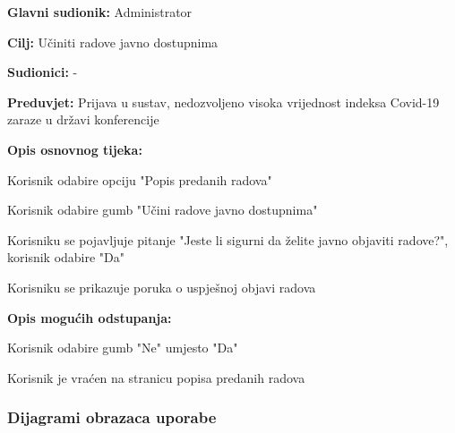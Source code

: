 					\begin{packed_item}
						
						\item \textbf{Glavni sudionik: } Administrator
						\item  \textbf{Cilj:} Učiniti radove javno dostupnima
						\item  \textbf{Sudionici:} -
						\item  \textbf{Preduvjet:} Prijava u sustav, nedozvoljeno visoka vrijednost indeksa Covid-19 zaraze u državi konferencije
						\item  \textbf{Opis osnovnog tijeka:}
						
						\item[] \begin{packed_enum}
							
							\item Korisnik odabire opciju "Popis predanih radova"
							\item Korisnik odabire gumb "Učini radove javno dostupnima"
							\item Korisniku se pojavljuje pitanje "Jeste li sigurni da želite javno objaviti radove?", korisnik odabire "Da"
							\item Korisniku se prikazuje poruka o uspješnoj objavi radova
							
						\end{packed_enum}
					
						\item \textbf{Opis mogućih odstupanja:}
						\item[] \begin{packed_enum}
							\item[3.a] Korisnik odabire gumb "Ne" umjesto "Da"
							\item[] \begin{packed_enum}
								\item[1.] Korisnik je vraćen na stranicu popisa predanih radova
							\end{packed_enum} 
						\end{packed_enum}
						
					\end{packed_item}

					
					
				
					
				\subsubsection{Dijagrami obrazaca uporabe}
					
